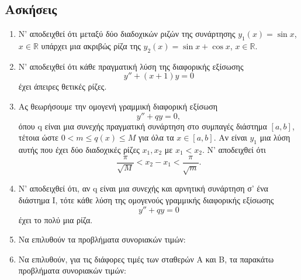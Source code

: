 \documentclass[11pt,a4paper,twoside]{book}
\begin{document}
\subsection{Ασκήσεις}
\begin{enumerate}
    \item Ν' αποδειχθεί ότι μεταξύ δύο διαδοχικών ριζών της συνάρτησης $y_1(x)=\sin x$, $x \in \mathbb{R}$ υπάρχει μια ακριβώς ρίζα της $y_2(x)=\sin x + \cos x$, $x \in \mathbb{R}$.
    \item Ν' αποδειχθεί ότι κάθε πραγματική λύση της διαφορικής εξίσωσης
    \[ y''+(x+1)y=0 \]
    έχει άπειρες θετικές ρίζες.
    \item Ας θεωρήσουμε την ομογενή γραμμική διαφορική εξίσωση
    \[ y''+qy=0, \]
    όπου q είναι μια συνεχής πραγματική συνάρτηση στο συμπαγές διάστημα $[a,b]$, τέτοια ώστε $0<m \le q(x) \le M$ για όλα τα $x \in [a,b]$. Αν είναι $y_1$ μια λύση αυτής που έχει δύο διαδοχικές ρίζες $x_1, x_2$ με $x_1 < x_2$. Ν' αποδειχθεί ότι
    \[ \frac{\pi}{\sqrt{M}} < x_2-x_1 < \frac{\pi}{\sqrt{m}}. \]
    \item Ν' αποδειχθεί ότι, αν q είναι μια συνεχής και αρνητική συνάρτηση σ' ένα διάστημα Ι, τότε κάθε λύση της ομογενούς γραμμικής διαφορικής εξίσωσης
    \[ y''+qy=0 \]
    έχει το πολύ μια ρίζα.
    \item Να επιλυθούν τα προβλήματα συνοριακών τιμών:

\item Να επιλυθούν, για τις διάφορες τιμές των σταθερών A και B, τα παρακάτω προβλήματα συνοριακών τιμών:


\end{enumerate}
\end{document}
